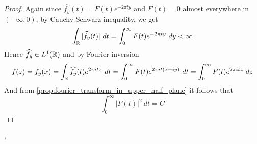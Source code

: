 \begin{proof}
  Again since $\widehat{f_y}(t) = F(t)e^{-2\pi ty}$ and $F(t) = 0$ almost everywhere in $(-\infty, 0)$, by Cauchy Schwarz inequality, we get
  $$\int_\mathbb R |\widehat{f_y}(t)| \ dt = \int_{0}^\infty F(t) e^{-2\pi ty} \ dy < \infty$$
  Hence $\widehat{f_y} \in L^1(\mathbb R)$ and by Fourier inversion
  $$f(z) = f_y(x) = \int_\mathbb R \widehat{f_y}(t) e^{2\pi it x}\ dt = \int_0^\infty F(t)e^{2\pi it(x+iy)} \ dt = \int_{0}^\infty F(t)e^{2\pi itz} \ dz$$
  And from \autoref{prop:fourier_transform_in_upper_half_plane} it follows that $$\int_0^\infty |F(t)|^2 \ dt = C$$
\end{proof}
\cite{AxlerMeasure} \cite{papaRudin}, \textcite{Grafakos2017a}
